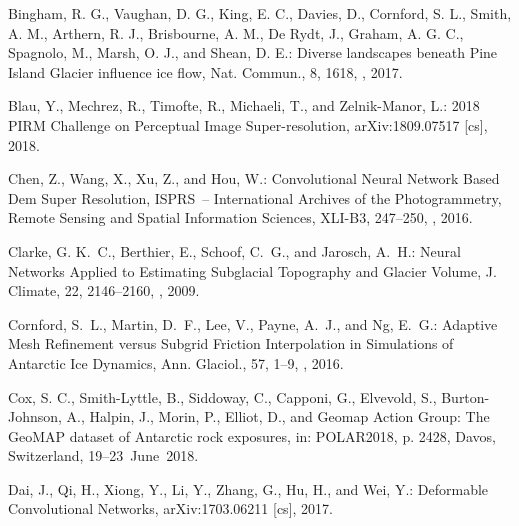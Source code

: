 \documentclass[tc, noline]{copernicus}
\begin{document}
\begin{thebibliography}{95}
Bingham, R. G., Vaughan, D. G., King, E. C., Davies, D., Cornford, S. L., Smith, A. M., Arthern, R. J., Brisbourne, A. M., De Rydt, J., Graham, A. G. C., Spagnolo, M., Marsh, O. J., and Shean, D. E.: Diverse landscapes beneath Pine Island Glacier influence ice flow, Nat. Commun., 8, 1618, , 2017.

Blau, Y., Mechrez, R., Timofte, R., Michaeli, T., and Zelnik-Manor, L.: 2018 PIRM Challenge on Perceptual Image Super-resolution, arXiv:1809.07517 [cs], 2018.


Chen, Z., Wang, X., Xu, Z., and Hou, W.:
Convolutional Neural Network Based Dem Super Resolution, ISPRS~-- International Archives of the Photogrammetry,
Remote Sensing and Spatial Information Sciences,
XLI-B3, 247--250, , 2016.

Clarke, G. K.~C., Berthier, E., Schoof, C.~G., and Jarosch, A.~H.:
Neural Networks Applied to Estimating Subglacial Topography and Glacier Volume,
J. Climate,
22, 2146--2160, , 2009.

Cornford, S.~L., Martin, D.~F., Lee, V., Payne, A.~J., and Ng, E.~G.:
Adaptive Mesh Refinement versus Subgrid Friction Interpolation in Simulations of Antarctic Ice Dynamics,
Ann. Glaciol.,
57, 1--9, , 2016.

Cox, S. C., Smith-Lyttle, B., Siddoway, C., Capponi, G., Elvevold, S., Burton-Johnson, A., Halpin, J., Morin, P., Elliot, D., and Geomap Action Group: The GeoMAP dataset of Antarctic rock exposures, in: POLAR2018, p. 2428, Davos, Switzerland, 19--23~June~2018.


Dai, J., Qi, H., Xiong, Y., Li, Y., Zhang, G., Hu, H., and Wei, Y.:
Deformable Convolutional Networks,
arXiv:1703.06211 [cs], 2017.


\end{thebibliography}
\end{document}
